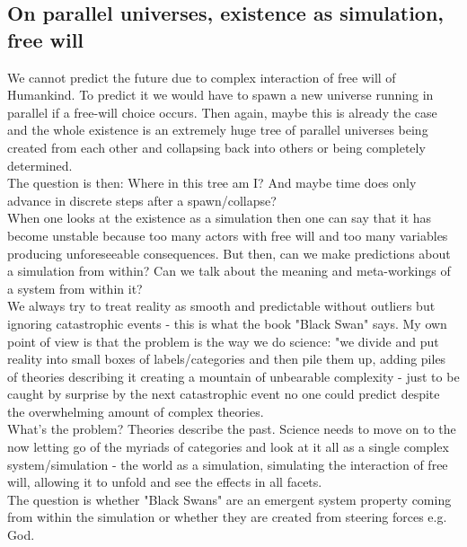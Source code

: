 \subsection{On parallel universes, existence as simulation, free will}
We cannot predict the future due to complex interaction of free will of Humankind. To predict it we would have to spawn a new universe running in parallel if a free-will choice occurs. Then again, maybe this is already the case and the whole existence is an extremely huge tree of parallel universes being created from each other and collapsing back into others or being completely determined. \\
The question is then: Where in this tree am I? And maybe time does only advance in discrete steps after a spawn/collapse? \\
When one looks at the existence as a simulation then one can say that it has become unstable because too many actors with free will and too many variables producing unforeseeable consequences. But then, can we make predictions about a simulation from within? Can we talk about the meaning and meta-workings of a system from within it? \\
We always try to treat reality as smooth and predictable without outliers but ignoring catastrophic events - this is what the book "Black Swan" says. My own point of view is that the problem is the way we do science: "we divide and put reality into small boxes of labels/categories and then pile them up, adding piles of theories describing it creating a mountain of unbearable complexity - just to be caught by surprise by the next catastrophic event no one could predict despite the overwhelming amount of complex theories. \\
What's the problem? Theories describe the past. Science needs to move on to the now letting go of the myriads of categories and look at it all as a single complex system/simulation - the world as a simulation, simulating the interaction of free will, allowing it to unfold and see the effects in all facets. \\
The question is whether "Black Swans" are an emergent system property coming from within the simulation or whether they are created from steering forces e.g. God.


